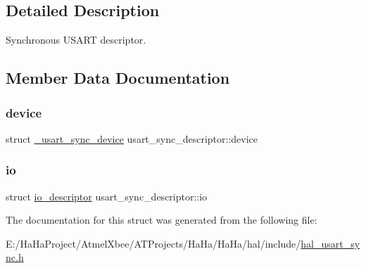 \subsection{Detailed Description}
Synchronous U\+S\+A\+RT descriptor. 

\subsection{Member Data Documentation}
\mbox{\label{structusart__sync__descriptor_a825cfcdd7f23413952a2a198b8a07ad5}} 
\subsubsection{\texorpdfstring{device}{device}}
{\footnotesize\ttfamily struct \hyperlink{struct__usart__sync__device}{\+\_\+usart\+\_\+sync\+\_\+device} usart\+\_\+sync\+\_\+descriptor\+::device}

\mbox{\label{structusart__sync__descriptor_a9ef5dd1d1c2010fc961d3e803c7429cb}} 
\subsubsection{\texorpdfstring{io}{io}}
{\footnotesize\ttfamily struct \hyperlink{structio__descriptor}{io\+\_\+descriptor} usart\+\_\+sync\+\_\+descriptor\+::io}



The documentation for this struct was generated from the following file\+:\begin{DoxyCompactItemize}
\item 
E\+:/\+Ha\+Ha\+Project/\+Atmel\+Xbee/\+A\+T\+Projects/\+Ha\+Ha/\+Ha\+Ha/hal/include/\hyperlink{hal__usart__sync_8h}{hal\+\_\+usart\+\_\+sync.\+h}\end{DoxyCompactItemize}
